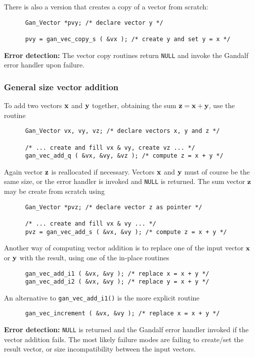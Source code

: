 There is also a version that creates a copy of a vector from scratch:
\begin{verbatim}
      Gan_Vector *pvy; /* declare vector y */

      pvy = gan_vec_copy_s ( &vx ); /* create y and set y = x */
\end{verbatim}

{\bf Error detection:} The vector copy routines return {\tt NULL} and
invoke the Gandalf error handler upon failure.

\subsubsection{General size vector addition}
To add two vectors ${\bf x}$ and ${\bf y}$ together, obtaining the sum
${\bf z} = {\bf x} + {\bf y}$, use the routine
\begin{verbatim}
      Gan_Vector vx, vy, vz; /* declare vectors x, y and z */

      /* ... create and fill vx & vy, create vz ... */
      gan_vec_add_q ( &vx, &vy, &vz ); /* compute z = x + y */
\end{verbatim}
Again vector ${\bf z}$ is reallocated if necessary. Vectors ${\bf x}$ and
${\bf y}$ must of course be the same size, or the error handler is invoked
and {\tt NULL} is returned. The sum vector ${\bf z}$ may be create from scratch
using
\begin{verbatim}
      Gan_Vector *pvz; /* declare vector z as pointer */

      /* ... create and fill vx & vy ... */
      pvz = gan_vec_add_s ( &vx, &vy ); /* compute z = x + y */
\end{verbatim}
Another way of computing vector addition is to replace one of the input
vector ${\bf x}$ or ${\bf y}$ with the result, using one of the in-place routines
\begin{verbatim}
      gan_vec_add_i1 ( &vx, &vy ); /* replace x = x + y */
      gan_vec_add_i2 ( &vx, &vy ); /* replace y = x + y */
\end{verbatim}
An alternative to {\tt gan\_vec\_add\_i1()} is the more explicit routine
\begin{verbatim}
      gan_vec_increment ( &vx, &vy ); /* replace x = x + y */
\end{verbatim}

{\bf Error detection:} {\tt NULL} is returned and the Gandalf error handler
invoked if the vector addition fails.
The most likely failure modes are failing to create/set the result vector,
or size incompatibility between the input vectors.


